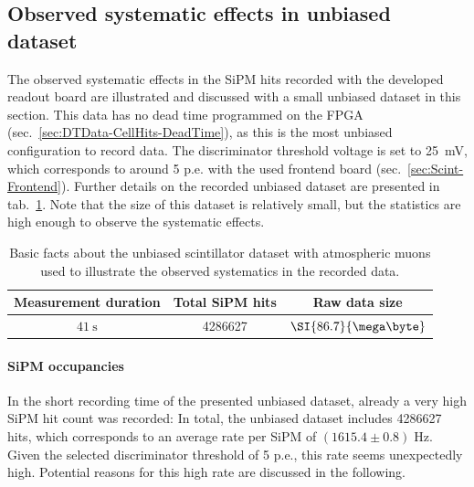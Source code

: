 \subsection{Observed systematic effects in unbiased dataset}
\label{sec:ScintData-Hits-Systematics}
The observed systematic effects in the \ac{SiPM} hits recorded with the developed readout board are illustrated and discussed with a small unbiased dataset in this section. This data has no dead time programmed on the \ac{FPGA} (sec.\ \ref{sec:DTData-CellHits-DeadTime}), as this is the most unbiased configuration to record data. The discriminator threshold voltage is set to \SI{25}{\milli\volt}, which corresponds to around 5 \ac{p.e.} with the used frontend board (sec.\ \ref{sec:Scint-Frontend}). Further details on the recorded unbiased dataset are presented in tab.\ \ref{tab:ScintData-Unbiased-DatasetInfo}. Note that the size of this dataset is relatively small, but the statistics are high enough to observe the systematic effects.
\begin{table}[htb]
    \centering
    \begin{tabular}{|c|c|c|} 
        \hline %
        Measurement duration & Total \ac{SiPM} hits & Raw data size \\ \hline
        $\SI{41}{\second}$ & \num{4286627} & $\SI{86.7}{\mega\byte}$ \\ \hline
    \end{tabular}
    \caption{Basic facts about the unbiased scintillator dataset with atmospheric muons used to illustrate the observed systematics in the recorded data.}
    \label{tab:ScintData-Unbiased-DatasetInfo}
\end{table}
\paragraph{SiPM occupancies}
In the short recording time of the presented unbiased dataset, already a very high \ac{SiPM} hit count was recorded: In total, the unbiased dataset includes \num{4286627} hits, which corresponds to an average rate per \ac{SiPM} of $(1615.4 \pm 0.8)\;\si{\hertz}$. Given the selected discriminator threshold of 5 \ac{p.e.}, this rate seems unexpectedly high. Potential reasons for this high rate are discussed in the following.
